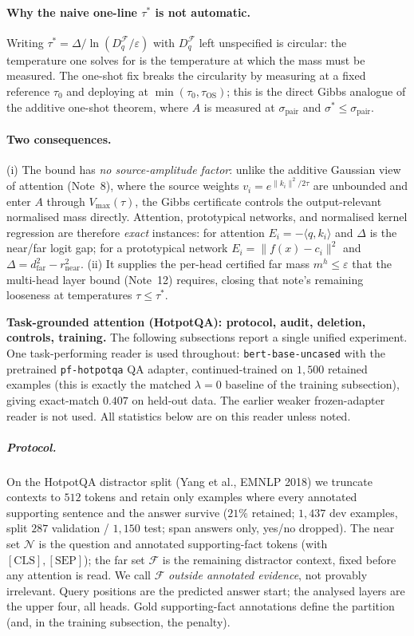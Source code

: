 \documentclass[10pt,twocolumn]{article}
\newcommand{\sstar}{\sigma^{*}}
\begin{document}
\paragraph{Why the naive one-line $\tau^*$ is not automatic.} Writing $\tau^*=\Delta/\ln(D_q^{\mathcal{F}}/\varepsilon)$ with $D_q^{\mathcal{F}}$ left unspecified is circular: the temperature one solves for is the temperature at which the mass must be measured. The one-shot fix breaks the circularity by measuring at a fixed reference $\tau_0$ and deploying at $\min(\tau_0,\tau_{\mathrm{OS}})$; this is the direct Gibbs analogue of the additive one-shot theorem, where $A$ is measured at $\sigma_{\mathrm{pair}}$ and $\sstar\le\sigma_{\mathrm{pair}}$.
\paragraph{Two consequences.} (i) The bound has \emph{no source-amplitude factor}: unlike the additive Gaussian view of attention (Note~8), where the source weights $v_i=e^{\lVert k_i\rVert^2/2\tau}$ are unbounded and enter $A$ through $V_{\max}(\tau)$, the Gibbs certificate controls the output-relevant normalised mass directly. Attention, prototypical networks, and normalised kernel regression are therefore \emph{exact} instances: for attention $E_i=-\langle q,k_i\rangle$ and $\Delta$ is the near/far logit gap; for a prototypical network $E_i=\lVert f(x)-c_i\rVert^2$ and $\Delta=d_{\mathrm{far}}^2-r_{\mathrm{near}}^2$. (ii) It supplies the per-head certified far mass $m^h\le\varepsilon$ that the multi-head layer bound (Note~12) requires, closing that note's remaining looseness at temperatures $\tau\le\tau^*$.

\medskip\noindent\textbf{Task-grounded attention (HotpotQA): protocol, audit, deletion, controls, training.} The following subsections report a single unified experiment. One task-performing reader is used throughout: \texttt{bert-base-uncased} with the pretrained \texttt{pf-hotpotqa} QA adapter, continued-trained on $1{,}500$ retained examples (this is exactly the matched $\lambda{=}0$ baseline of the training subsection), giving exact-match $0.407$ on held-out data. The earlier weaker frozen-adapter reader is not used. All statistics below are on this reader unless noted.

\subparagraph{Protocol.} On the HotpotQA distractor split (Yang et al., EMNLP 2018) we truncate contexts to $512$ tokens and retain only examples where every annotated supporting sentence and the answer survive ($21\%$ retained; $1{,}437$ dev examples, split $287$ validation / $1{,}150$ test; span answers only, yes/no dropped). The near set $\mathcal{N}$ is the question and annotated supporting-fact tokens (with $[\mathrm{CLS}],[\mathrm{SEP}]$); the far set $\mathcal{F}$ is the remaining distractor context, fixed before any attention is read. We call $\mathcal{F}$ \emph{outside annotated evidence}, not provably irrelevant. Query positions are the predicted answer start; the analysed layers are the upper four, all heads. Gold supporting-fact annotations define the partition (and, in the training subsection, the penalty).
\end{document}
